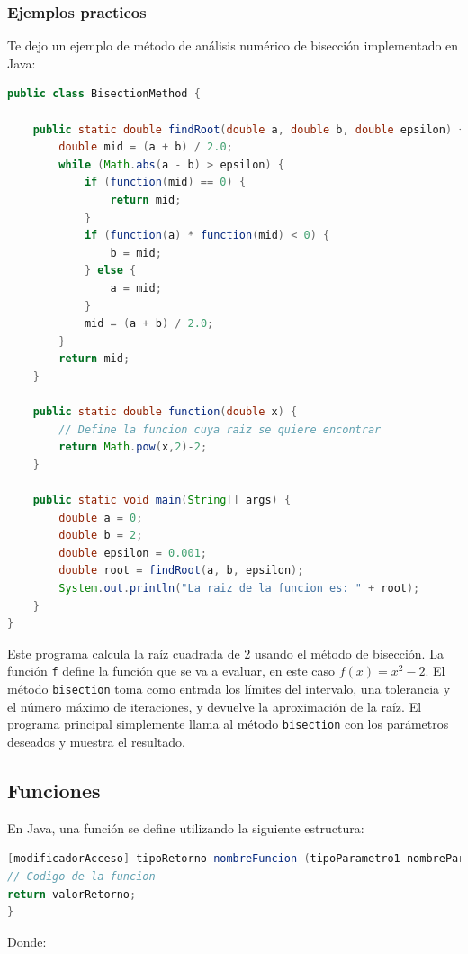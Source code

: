 \documentclass[executivepaper]{article}
\begin{document}
\subsubsection{Ejemplos practicos}
Te dejo un ejemplo de método de análisis numérico de bisección implementado en Java:
\begin{lstlisting}[language=Java]
public class BisectionMethod {

    public static double findRoot(double a, double b, double epsilon) {
        double mid = (a + b) / 2.0;
        while (Math.abs(a - b) > epsilon) {
            if (function(mid) == 0) {
                return mid;
            }
            if (function(a) * function(mid) < 0) {
                b = mid;
            } else {
                a = mid;
            }
            mid = (a + b) / 2.0;
        }
        return mid;
    }

    public static double function(double x) {
        // Define la funcion cuya raiz se quiere encontrar
        return Math.pow(x,2)-2;
    }

    public static void main(String[] args) {
        double a = 0;
        double b = 2;
        double epsilon = 0.001;
        double root = findRoot(a, b, epsilon);
        System.out.println("La raiz de la funcion es: " + root);
    }
}
\end{lstlisting}
Este programa calcula la raíz cuadrada de 2 usando el método de bisección. La función \texttt{f} define la función que se va a evaluar, en este caso $f(x) = x^2 - 2$. El método \texttt{bisection} toma como entrada los límites del intervalo, una tolerancia y el número máximo de iteraciones, y devuelve la aproximación de la raíz. El programa principal simplemente llama al método \texttt{bisection} con los parámetros deseados y muestra el resultado.

\subsection{Funciones}
En Java, una función se define utilizando la siguiente estructura:

\begin{lstlisting}[language=Java]
[modificadorAcceso] tipoRetorno nombreFuncion (tipoParametro1 nombreParametro1, tipoParametro2 nombreParametro2, ...) {
// Codigo de la funcion
return valorRetorno;
}
\end{lstlisting}

Donde:
\end{document}
